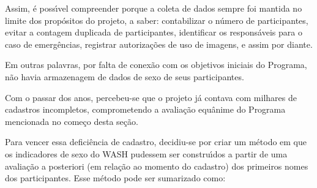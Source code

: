 \documentclass[
12pt,		%
openright,	%
twoside,  %
a4paper,			%
chapter=TITLE,		%
english,			%
french,				%
spanish,			%
brazil				%
]{USPSC-classe/USPSC}
\begin{document}
Assim, \'e poss\'{\i}vel compreender porque a coleta de dados sempre foi mantida no limite dos prop\'ositos do projeto, a saber: contabilizar o n\'umero de participantes, evitar a contagem duplicada de participantes, identificar os respons\'aveis para o caso de emerg\^encias, registrar autoriza\c{c}\~oes de uso de imagens, e assim por diante.









Em outras palavras, por falta de conex\~ao com os objetivos iniciais do Programa, n\~ao havia armazenagem de dados de sexo de seus participantes.









Com o passar dos anos, percebeu-se que o projeto j\'a contava com milhares de cadastros incompletos, comprometendo a avalia\c{c}\~ao equ\^anime do Programa mencionada no come\c{c}o desta se\c{c}\~ao.









Para vencer essa defici\^encia de cadastro, decidiu-se por criar um m\'etodo em que os indicadores de sexo do WASH pudessem ser constru\'{\i}dos a partir de uma avalia\c{c}\~ao a posteriori (em rela\c{c}\~ao ao momento do cadastro) dos primeiros nomes dos participantes. Esse m\'etodo pode ser sumarizado como:










\noindent\begin{center}\mbox{\centering{}}\end{center}
\end{document}
